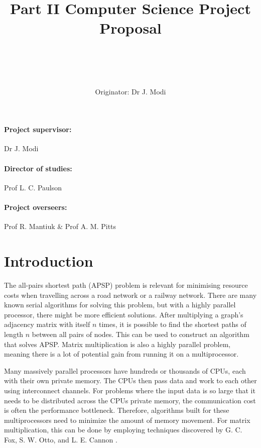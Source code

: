 \documentclass{article}
\title{
    {\large Part II Computer Science Project Proposal} \\~\\
\dissertationtitle}
\author{
    \authorname\\~\\
Originator: Dr J. Modi \\ }
\begin{document}
\maketitle

\paragraph{Project supervisor:}%
\label{par:Project Supervisor}
Dr J. Modi

\paragraph{Director of studies:}%
\label{par:Director of Studies:}
Prof L. C. Paulson

\paragraph{Project overseers:}%
\label{par:Project Overseers:}
Prof R. Mantiuk \& Prof A. M. Pitts

\newpage

\section*{Introduction}

The all-pairs shortest path (APSP) problem is relevant for minimising resource
costs when travelling across a road network or a railway network. There are
many known serial algorithms for solving this problem, but with a highly
parallel processor, there might be more efficient solutions. After multiplying
a graph's adjacency matrix with itself $n$ times, it is possible to find the
shortest paths of length $n$ between all pairs of nodes. This can be used to
construct an algorithm that solves APSP.  Matrix multiplication is also a
highly parallel problem, meaning there is a lot of potential gain from running
it on a multiprocessor.

Many massively parallel processors have hundreds or thousands of CPUs, each
with their own private memory. The CPUs then pass data and work to each other
using interconnect channels.  For problems where the input data is so large
that it needs to be distributed across the CPUs private memory, the communication
cost is often the performance bottleneck. Therefore, algorithms built for these
multiprocessors need to minimize the amount of memory movement.  For matrix
multiplication, this can be done by employing techniques discovered by G. C.
Fox, S. W. Otto, and L. E. Cannon \cite{fox, cannon}.
\end{document}
